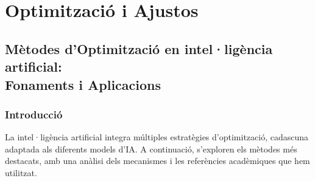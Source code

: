 \chapter{Optimització i Ajustos}\label{a:optimitzacioAjustos}

\section{Mètodes d'Optimització en intel·ligència artificial:\\Fonaments i Aplicacions}

\subsection*{Introducció}

La intel·ligència artificial integra múltiples estratègies d'optimització, cadascuna adaptada als diferents models d'IA. A continuació, s'exploren els mètodes més destacats, amb una anàlisi dels mecanismes i les referències acadèmiques que hem utilitzat.

